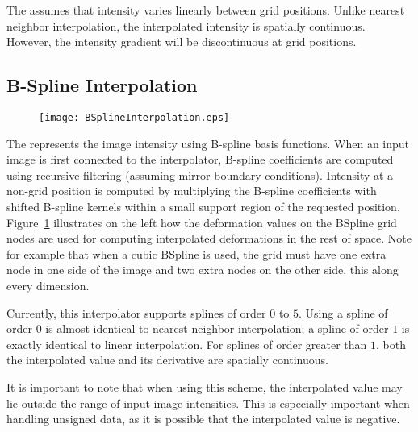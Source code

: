 The  assumes that intensity varies
linearly between grid positions. Unlike nearest neighbor interpolation, the
interpolated intensity is spatially continuous. However, the intensity
gradient will be discontinuous at grid positions.


\subsection{B-Spline Interpolation}
\label{sec:BSplineInterpolation}

\begin{figure}
\center
\texttt{[image: BSplineInterpolation.eps]}
\label{fig:BSplineInterpolation}
\end{figure}


The  represents the image intensity
using B-spline basis functions. When an input image is first connected to the
interpolator, B-spline coefficients are computed using recursive filtering
(assuming mirror boundary conditions). Intensity at a non-grid position is
computed by multiplying the B-spline coefficients with shifted B-spline kernels
within a small support region of the requested position.
Figure~\ref{fig:BSplineInterpolation} illustrates on the left how the
deformation values on the BSpline grid nodes are used for computing
interpolated deformations in the rest of space. Note for example that when a
cubic BSpline is used, the grid must have one extra node in one side of the
image and two extra nodes on the other side, this along every dimension.

Currently, this interpolator supports splines of order $0$ to $5$. Using a
spline of order $0$ is almost identical to nearest neighbor interpolation; a
spline of order $1$ is exactly identical to linear interpolation. For splines
of order greater than $1$, both the interpolated value and its derivative are
spatially continuous.

It is important to note that when using this scheme, the interpolated
value may lie outside the range of input image intensities. This is
especially important when handling unsigned data, as it is possible
that the interpolated value is negative.



